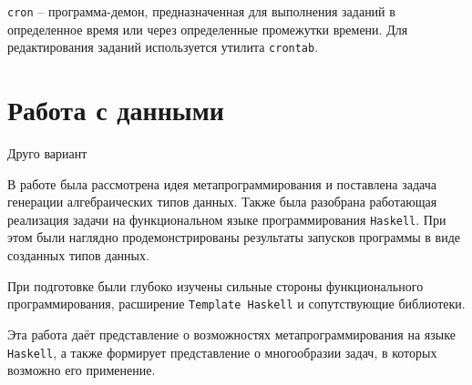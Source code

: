 \lstinline{cron} – программа-демон, предназначенная для выполнения заданий в определенное время или через определенные промежутки времени. Для редактирования заданий используется утилита \lstinline{crontab}.

\section{Работа с данными}

Друго вариант 

\Conc

В работе была рассмотрена идея метапрограммирования и поставлена задача генерации алгебраических типов данных. Также была разобрана работающая реализация задачи на функциональном языке программирования \lstinline{Haskell}. При этом были наглядно продемонстрированы результаты запусков программы в виде созданных типов данных.

При подготовке были глубоко изучены сильные стороны функционального программирования, расширение \lstinline{Template Haskell} и сопутствующие библиотеки.

Эта работа даёт представление о возможностях метапрограммирования на языке \lstinline{Haskell}, а также формирует представление о многообразии задач, в которых возможно его применение.	

\printbibliography[%
    heading=bibintoc%
]


